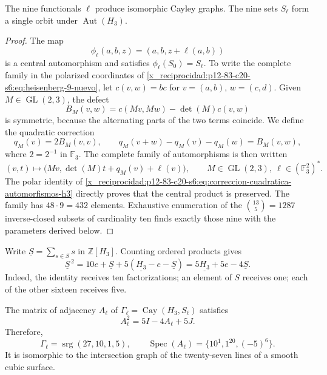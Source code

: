 \begin{theorem}
\label{x_reciprocidad:p12-83-c20-s6:thm:independencia-calibre-e6}
The nine functionals \(\ell\) produce isomorphic Cayley graphs. The
nine sets \(S_\ell\) form a single orbit under
\(\operatorname{Aut}(H_3)\).
\end{theorem}

\begin{proof}
The map
\[
 \phi_\ell(a,b,z)=(a,b,z+\ell(a,b))
\]
is a central automorphism and satisfies
\(\phi_\ell(S_0)=S_\ell\). To write the complete family in the
polarized coordinates of \cref{x_reciprocidad:p12-83-c20-s6:eq:heisenberg-9-nuevo}, let
\(c(v,w)=b c\) for \(v=(a,b)\), \(w=(c,d)\). Given
\(M\in\operatorname{GL}(2,3)\), the defect
\[
 B_M(v,w)=c(Mv,Mw)-\det(M)c(v,w)
\]
is symmetric, because the alternating parts of the two terms coincide. We define the quadratic correction
\begin{equation}
 q_M(v)=2B_M(v,v),
 \qquad
 q_M(v+w)-q_M(v)-q_M(w)=B_M(v,w),
 \label{x_reciprocidad:p12-83-c20-s6:eq:correccion-cuadratica-automorfismos-h3}
\end{equation}
where \(2=2^{-1}\) in \(\mathbb F_3\). The complete family of
automorphisms is then written
\begin{equation}
 (v,t)\longmapsto
 \bigl(Mv,\det(M)t+q_M(v)+\ell(v)\bigr),
 \qquad M\in\operatorname{GL}(2,3),\
 \ell\in(\mathbb F_3^2)^*.
 \label{x_reciprocidad:p12-83-c20-s6:eq:automorfismos-h3-completos}
\end{equation}
The polar identity of \cref{x_reciprocidad:p12-83-c20-s6:eq:correccion-cuadratica-automorfismos-h3}
directly proves that the central product is preserved. The family has
\(48\cdot9=432\) elements. Exhaustive enumeration of the
\(\binom{13}{5}=1287\) inverse-closed subsets of cardinality ten
finds exactly those nine with the parameters derived
below.
\end{proof}

Write \(\underline S=\sum_{s\in S}s\) in
\(\mathbb Z[H_3]\). Counting ordered products gives
\begin{equation}
 \underline S^{\,2}
 =10e+\underline S+5(\underline{H_3}-e-\underline S)
 =5\underline{H_3}+5e-4\underline S.
 \label{x_reciprocidad:p12-83-c20-s6:eq:identidad-grupo-schlafli-nueva}
\end{equation}
Indeed, the identity receives ten factorizations; an element of
\(S\) receives one; each of the other sixteen receives five.

\begin{theorem}
\label{x_reciprocidad:p12-83-c20-s6:thm:grafo-27-rectas-nuevo}
The matrix of adjacency \(A_\ell\) of
\(\Gamma_\ell=\operatorname{Cay}(H_3,S_\ell)\) satisfies
\begin{equation}
 A_\ell^2=5I-4A_\ell+5J.
 \label{x_reciprocidad:p12-83-c20-s6:eq:identidad-schlafli-nueva}
\end{equation}
Therefore,
\[
 \Gamma_\ell=\operatorname{srg}(27,10,1,5),
 \qquad
 \operatorname{Spec}(A_\ell)=\{10^1,1^{20},(-5)^6\}.
\]
It is isomorphic to the intersection graph of the twenty-seven lines of a
smooth cubic surface.
\end{theorem}

